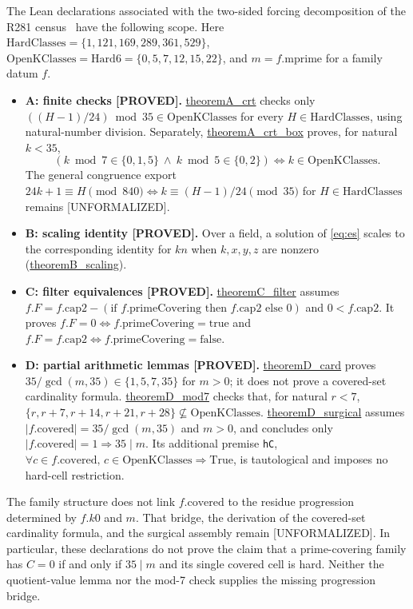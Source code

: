 \documentclass[11pt,a4paper]{article}
\theoremstyle{definition}
\begin{document}
The Lean declarations associated with the two-sided forcing decomposition
of the R281 census~\cite{D322} have the following scope. Here
$\mathrm{HardClasses}=\{1,121,169,289,361,529\}$,
$\mathrm{OpenKClasses}=\text{Hard6}=\{0,5,7,12,15,22\}$, and
$m=f.\mathrm{mprime}$ for a family datum $f$.
\begin{itemize}
\item \textbf{A: finite checks [PROVED].} \url{theoremA_crt} checks only
  $((H-1)/24)\bmod35\in\mathrm{OpenKClasses}$ for every
  $H\in\mathrm{HardClasses}$, using natural-number division.
  Separately, \url{theoremA_crt_box} proves, for natural $k<35$,
  \[
    (k\bmod7\in\{0,1,5\}\ \land\ k\bmod5\in\{0,2\})
    \iff k\in\mathrm{OpenKClasses}.
  \]
  The general congruence export
  $24k+1\equiv H\pmod{840}\iff k\equiv(H-1)/24\pmod{35}$
  for $H\in\mathrm{HardClasses}$ remains [UNFORMALIZED].
\item \textbf{B: scaling identity [PROVED].} Over a field, a solution of
  \eqref{eq:es} scales to the corresponding identity for $kn$ when
  $k,x,y,z$ are nonzero (\url{theoremB_scaling}).
\item \textbf{C: filter equivalences [PROVED].} \url{theoremC_filter}
  assumes $f.F=f.\mathrm{cap2}-(\text{if }f.\mathrm{primeCovering}
  \text{ then }f.\mathrm{cap2}\text{ else }0)$ and
  $0<f.\mathrm{cap2}$. It proves $f.F=0\iff f.\mathrm{primeCovering}
  =\mathrm{true}$ and $f.F=f.\mathrm{cap2}\iff f.\mathrm{primeCovering}
  =\mathrm{false}$.
\item \textbf{D: partial arithmetic lemmas [PROVED].}
  \url{theoremD_card} proves $35/\gcd(m,35)\in\{1,5,7,35\}$ for $m>0$;
  it does not prove a covered-set cardinality formula.
  \url{theoremD_mod7} checks that, for natural $r<7$,
  $\{r,r+7,r+14,r+21,r+28\}\not\subseteq\mathrm{OpenKClasses}$.
  \url{theoremD_surgical} assumes
  $|f.\mathrm{covered}|=35/\gcd(m,35)$ and $m>0$, and concludes only
  $|f.\mathrm{covered}|=1\Rightarrow35\mid m$. Its additional premise
  \texttt{hC}, $\forall c\in f.\mathrm{covered},\,
  c\in\mathrm{OpenKClasses}\Rightarrow\mathrm{True}$, is tautological
  and imposes no hard-cell restriction.
\end{itemize}
The family structure does not link $f.\mathrm{covered}$ to the residue
progression determined by $f.k0$ and $m$. That bridge, the derivation of
the covered-set cardinality formula, and the surgical assembly remain
[UNFORMALIZED]. In particular, these declarations do not prove the claim
that a prime-covering family has $C=0$ if and only if $35\mid m$ and its
single covered cell is hard. Neither the quotient-value lemma nor the
mod-7 check supplies the missing progression bridge.
\end{document}
